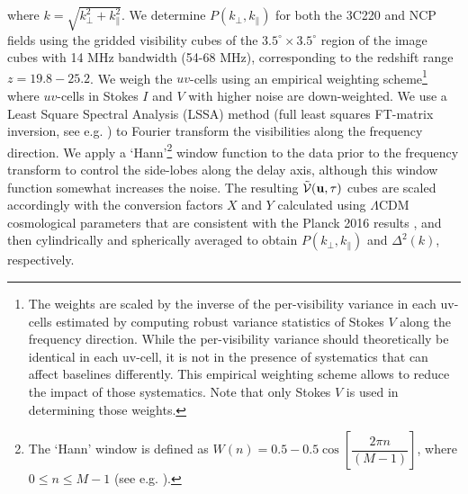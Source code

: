 \documentclass[fleqn,usenatbib]{mnras}
\begin{document}
where $k = \sqrt{k_{\perp}^2 + k_{\parallel}^2}$. We determine $P(k_{\perp},k_{\parallel})$ for both the 3C220 and NCP fields using the gridded visibility cubes of the $3.5^{\circ}\times 3.5^{\circ}$ region of the image cubes with 14 MHz bandwidth (54-68 MHz), corresponding to the redshift range $z=19.8 - 25.2$. We weigh the $uv$-cells using an empirical weighting scheme\footnote{The weights are scaled by the inverse of the per-visibility variance in each uv-cells estimated by computing robust variance statistics of Stokes $V$ along the frequency direction. While the per-visibility variance should theoretically be identical in each uv-cell, it is not in the presence of systematics that can affect baselines differently. This empirical weighting scheme allows to reduce the impact of those systematics. Note that only Stokes $V$ is used in determining those weights.} where $uv$-cells in Stokes $I$ and $V$ with higher noise are down-weighted. We use a Least Square Spectral Analysis (LSSA) method (full least squares FT-matrix inversion, see e.g. \citealt{barning1963,lomb1976,stoica2009,trott2016}) to Fourier transform the visibilities along the frequency direction. We apply a `Hann'\footnote{The `Hann' window is defined as $W(n) = 0.5 -0.5\cos \left[\dfrac{2\pi n}{(M-1)} \right]$, where $0\leq n\leq M-1$ (see e.g. \citealt{blackman1958,harris1978}).} window function to the data prior to the frequency transform to control the side-lobes along the delay axis, although this window function somewhat increases the noise. The resulting $\tilde{\mathcal{V}}({\it \mathbf{u}},\tau)$ cubes are scaled accordingly with the conversion factors $X$ and $Y$ calculated using $\Lambda$CDM cosmological parameters that are consistent with the Planck 2016 results \citep{planck2016}, and then cylindrically and spherically averaged to obtain $P(k_{\perp},k_{\parallel})$ and $\Delta^2(k)$, respectively. 
\end{document}
